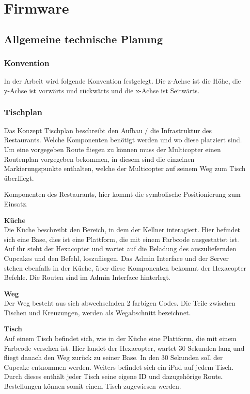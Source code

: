 \chapter{Firmware}
\renewcommand{\kapitelautor}{Autor: Christina Bornberg, Lucas Ullrich}

\section{Allgemeine technische Planung}

  \subsection{Konvention}
  In der Arbeit wird folgende Konvention festgelegt. Die z-Achse ist die Höhe, die y-Achse ist vorwärts und rückwärts und die x-Achse ist Seitwärts.


  \subsection{Tischplan}
  Das Konzept Tischplan beschreibt den Aufbau / die Infrastruktur des Restaurants. Welche Komponenten benötigt werden und wo diese platziert sind.
  Um eine vorgegeben Route fliegen zu können muss der Multicopter einen Routenplan vorgegeben bekommen, in diesem sind die einzelnen Markierungspunkte enthalten, welche der Multicopter auf seinem Weg zum Tisch überfliegt.

  Komponenten des Restaurants, hier kommt die symbolische Positionierung zum Einsatz.

  \textbf{Küche}\\
  Die Küche beschreibt den Bereich, in dem der Kellner interagiert. Hier befindet sich eine Base, dies ist eine Plattform, die mit einem Farbcode ausgestattet ist. Auf ihr steht der Hexacopter und wartet auf die Beladung des auszuliefernden Cupcakes und den Befehl, loszufliegen.
  Das Admin Interface und der Server stehen ebenfalls in der Küche, über diese Komponenten bekommt der Hexacopter Befehle. Die Routen sind im Admin Interface hinterlegt.

  \textbf{Weg}\\
  Der Weg besteht aus sich abwechselnden 2 farbigen Codes. Die Teile zwischen Tischen und Kreuzungen, werden als Wegabschnitt bezeichnet.

  \textbf{Tisch}\\
  Auf einem Tisch befindet sich, wie in der Küche eine Plattform, die mit einem Farbcode versehen ist. Hier landet der Hexacopter, wartet 30 Sekunden lang und fliegt danach den Weg zurück zu seiner Base. In den 30 Sekunden soll der Cupcake entnommen werden. Weiters befindet sich ein iPad auf jedem Tisch. Durch dieses enthält jeder Tisch seine eigene ID und dazugehörige Route. Bestellungen können somit einem Tisch zugewiesen werden.

